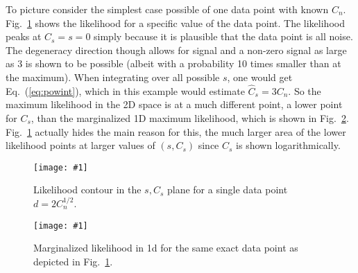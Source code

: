 \documentclass[11pt, oneside]{article}   	%
\newcommand{\ec}[1]{Eq.~(\ref{eq:#1})}
\newcommand{\sfig}[2]{
\texttt{[image: \#1]}
        }
\newcommand{\Spng}[2]{
   \begin{figure}[thbp]
   \begin{center}
    \sfig{#1.png}{0.9\columnwidth}
    \caption{{\small #2}}
    \label{fig:#1}
     \end{center}
   \end{figure}
}
\newcommand{\rf}[1]{\ref{fig:#1}}
\begin{document}
To picture consider the simplest case possible of one data point with known $C_n$. Fig.~\rf{l2} shows the likelihood for a specific value of the data point. The likelihood peaks at $C_s=s=0$ simply because it is plausible that the data point is all noise. The degeneracy direction though allows for signal and a non-zero signal as large as 3 is shown to be possible (albeit with a probability 10 times smaller than at the maximum). When integrating over all possible $s$, one would get \ec{powint}, which in this example would estimate $\hat C_s=3C_n$. So the maximum likelihood in the 2D space is at a much different point, a lower point for $C_s$, than the marginalized 1D maximum likelihood, which is shown in Fig.~\rf{like1d}. Fig.~\rf{l2} actually hides the main reason for this, the much larger area of the lower likelihood points at larger values of $(s,C_s)$ since $C_s$ is shown logarithmically.
\Spng{l2}{Likelihood contour in the $s,C_s$ plane for a single data point $d=2C_n^{1/2}$.}
\Spng{like1d}{Marginalized likelihood in 1d for the same exact data point as depicted in Fig.~\rf{l2}.}
\end{document}

